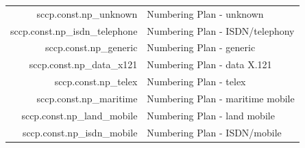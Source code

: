 \documentclass[a4paper,latin]{paper}
\begin{document}
\begin{tabularx}{\linewidth}{ | >{\ttfamily} r | >{\ttfamily} X |}
	sccp.const.np\_unknown				& Numbering Plan - unknown\\
	sccp.const.np\_isdn\_telephone			& Numbering Plan - ISDN/telephony\\
	sccp.const.np\_generic				& Numbering Plan - generic\\
	sccp.const.np\_data\_x121			& Numbering Plan - data X.121\\
	sccp.const.np\_telex				& Numbering Plan - telex\\	
	sccp.const.np\_maritime				& Numbering Plan - maritime mobile\\
	sccp.const.np\_land\_mobile			& Numbering Plan - land mobile\\
	sccp.const.np\_isdn\_mobile			& Numbering Plan - ISDN/mobile\\
	\hline
\end{tabularx}%
\clearpage
\end{document}
